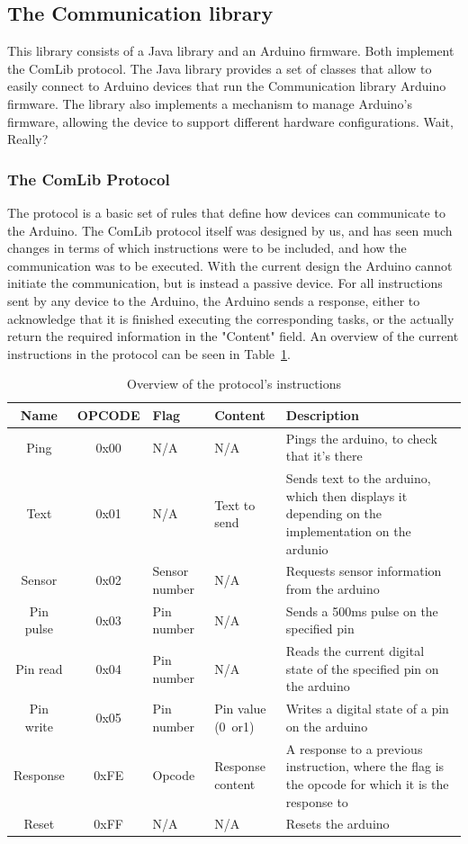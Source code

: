 \newpage

\subsection{The Communication library}
This library consists of a Java library and an Arduino firmware. Both implement the ComLib protocol.
The Java library provides a set of classes that allow to easily connect to Arduino devices that run the Communication library
Arduino firmware. The library also implements a mechanism to manage Arduino's firmware, allowing the device to support
different hardware configurations. Wait, Really?


\subsubsection{The ComLib Protocol}
The protocol is a basic set of rules that define how devices can communicate to the Arduino.
The ComLib protocol itself was designed by us, and has seen much changes in terms of which instructions were to be included,
and how the communication was to be executed. With the current design the Arduino cannot initiate the communication,
but is instead a passive device. For all instructions sent by any device to the Arduino, the Arduino sends a response,
either to acknowledge that it is finished executing the corresponding tasks, or the actually return the required
information in the "Content" field. An overview of the current instructions in the protocol can be seen in Table~\ref{tbl:opcodes}.

\begin{table}[h!]
\begin{tabular}{ | c | c | p{1.5cm} | p{1.7cm} | p{6cm} |}
\hline
\textbf{Name} & \textbf{OPCODE} & \textbf{Flag} & \textbf{Content} & \textbf{Description} \\
\hline
Ping & 0x00 & N/A & N/A & Pings the arduino, to check that it's there \\
\hline
Text & 0x01 & N/A & Text to send & Sends text to the arduino, which then displays it depending on the implementation on the ardunio \\
\hline
Sensor & 0x02 & Sensor number & N/A & Requests sensor information from the arduino \\
\hline
Pin pulse & 0x03 & Pin number & N/A & Sends a 500ms pulse on the specified pin \\
\hline
Pin read & 0x04 & Pin number & N/A & Reads the current digital state of the specified pin on the arduino \\
\hline
Pin write & 0x05 & Pin number & Pin value (0~or1) & Writes a digital state of a pin on the arduino \\
\hline
Response & 0xFE & Opcode & Response content & A response to a previous instruction, where the flag is the opcode for which it is the response to \\
\hline
Reset & 0xFF & N/A & N/A & Resets the arduino \\
\hline
\end{tabular}
\caption{Overview of the protocol's instructions}
\label{tbl:opcodes}
\end{table}

